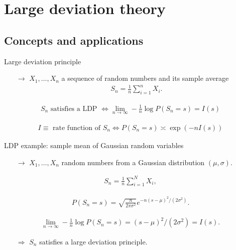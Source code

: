 \documentclass{beamer}
\begin{document}
\section{Large deviation theory}

\subsection{Concepts and applications}

\begin{frame}{Large deviation principle}


\begin{itemize}
  \item[$\rightarrow$] $X_1, \ldots, X_n$ a sequence of random numbers and its sample average
  \begin{align*}
    S_n = \frac{1}{n} \sum_{i=1}^n X_i.
  \end{align*}
\end{itemize}

\return
\begin{align*}
S_n \text{ satisfies a LDP } \Leftrightarrow \lim_{n \rightarrow \infty} - \frac{1}{n} \log P(S_n = s) = I(s)
\end{align*}

\return
\begin{align*}
I \equiv \text{ rate function of } S_n \Leftrightarrow P(S_n = s) \asymp \exp(- n I(s))
\end{align*}

\end{frame}

\begin{frame}{LDP example: sample mean of Gaussian random variables}

\begin{itemize}
  \item[$\rightarrow$] $X_1, \ldots, X_n$ random numbers from a Gaussian distribution $(\mu, \sigma)$.
\end{itemize}

\return
\begin{align*}
S_n = \frac{1}{n} \sum_{i=1}^N X_i,
\end{align*}

\return
\begin{align*}
P(S_n = s) = \sqrt{\frac{n}{2 \pi \sigma^2}} e^{-n(s - \mu)^2/(2\sigma^2)}.
\end{align*}

\return
\begin{align*}
\lim_{n \rightarrow \infty} - \frac{1}{n} \log P(S_n = s) = (s - \mu)^2/(2\sigma^2) = I(s).
\end{align*}
\begin{itemize}
\item[$\Rightarrow$] $S_n$ satisfies a large deviation principle.
\end{itemize}

\end{frame}
\end{document}
